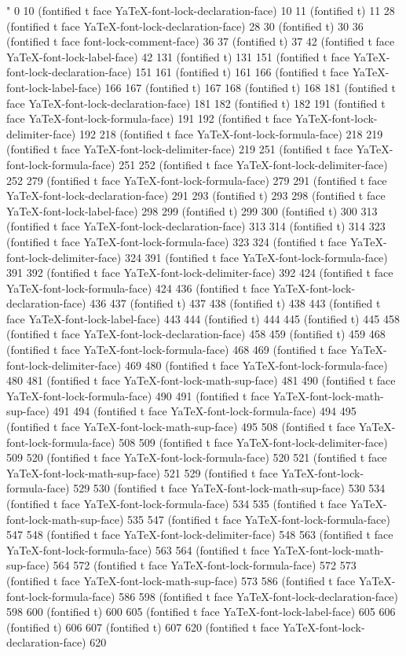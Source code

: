" 0 10 (fontified t face YaTeX-font-lock-declaration-face) 10 11 (fontified t) 11 28 (fontified t face YaTeX-font-lock-declaration-face) 28 30 (fontified t) 30 36 (fontified t face font-lock-comment-face) 36 37 (fontified t) 37 42 (fontified t face YaTeX-font-lock-label-face) 42 131 (fontified t) 131 151 (fontified t face YaTeX-font-lock-declaration-face) 151 161 (fontified t) 161 166 (fontified t face YaTeX-font-lock-label-face) 166 167 (fontified t) 167 168 (fontified t) 168 181 (fontified t face YaTeX-font-lock-declaration-face) 181 182 (fontified t) 182 191 (fontified t face YaTeX-font-lock-formula-face) 191 192 (fontified t face YaTeX-font-lock-delimiter-face) 192 218 (fontified t face YaTeX-font-lock-formula-face) 218 219 (fontified t face YaTeX-font-lock-delimiter-face) 219 251 (fontified t face YaTeX-font-lock-formula-face) 251 252 (fontified t face YaTeX-font-lock-delimiter-face) 252 279 (fontified t face YaTeX-font-lock-formula-face) 279 291 (fontified t face YaTeX-font-lock-declaration-face) 291 293 (fontified t) 293 298 (fontified t face YaTeX-font-lock-label-face) 298 299 (fontified t) 299 300 (fontified t) 300 313 (fontified t face YaTeX-font-lock-declaration-face) 313 314 (fontified t) 314 323 (fontified t face YaTeX-font-lock-formula-face) 323 324 (fontified t face YaTeX-font-lock-delimiter-face) 324 391 (fontified t face YaTeX-font-lock-formula-face) 391 392 (fontified t face YaTeX-font-lock-delimiter-face) 392 424 (fontified t face YaTeX-font-lock-formula-face) 424 436 (fontified t face YaTeX-font-lock-declaration-face) 436 437 (fontified t) 437 438 (fontified t) 438 443 (fontified t face YaTeX-font-lock-label-face) 443 444 (fontified t) 444 445 (fontified t) 445 458 (fontified t face YaTeX-font-lock-declaration-face) 458 459 (fontified t) 459 468 (fontified t face YaTeX-font-lock-formula-face) 468 469 (fontified t face YaTeX-font-lock-delimiter-face) 469 480 (fontified t face YaTeX-font-lock-formula-face) 480 481 (fontified t face YaTeX-font-lock-math-sup-face) 481 490 (fontified t face YaTeX-font-lock-formula-face) 490 491 (fontified t face YaTeX-font-lock-math-sup-face) 491 494 (fontified t face YaTeX-font-lock-formula-face) 494 495 (fontified t face YaTeX-font-lock-math-sup-face) 495 508 (fontified t face YaTeX-font-lock-formula-face) 508 509 (fontified t face YaTeX-font-lock-delimiter-face) 509 520 (fontified t face YaTeX-font-lock-formula-face) 520 521 (fontified t face YaTeX-font-lock-math-sup-face) 521 529 (fontified t face YaTeX-font-lock-formula-face) 529 530 (fontified t face YaTeX-font-lock-math-sup-face) 530 534 (fontified t face YaTeX-font-lock-formula-face) 534 535 (fontified t face YaTeX-font-lock-math-sup-face) 535 547 (fontified t face YaTeX-font-lock-formula-face) 547 548 (fontified t face YaTeX-font-lock-delimiter-face) 548 563 (fontified t face YaTeX-font-lock-formula-face) 563 564 (fontified t face YaTeX-font-lock-math-sup-face) 564 572 (fontified t face YaTeX-font-lock-formula-face) 572 573 (fontified t face YaTeX-font-lock-math-sup-face) 573 586 (fontified t face YaTeX-font-lock-formula-face) 586 598 (fontified t face YaTeX-font-lock-declaration-face) 598 600 (fontified t) 600 605 (fontified t face YaTeX-font-lock-label-face) 605 606 (fontified t) 606 607 (fontified t) 607 620 (fontified t face YaTeX-font-lock-declaration-face) 620 